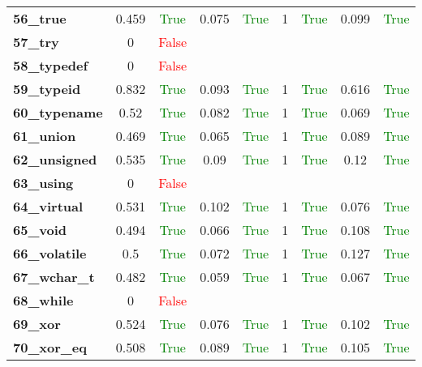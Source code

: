 \documentclass{article}
\begin{document}
\begin{xltabular}{\textwidth}{lcccccccc}
\textbf{56\_true}& 0.459&\textcolor{green}{True}& 0.075&\textcolor{green}{True}& 1&\textcolor{green}{True}& 0.099&\textcolor{green}{True} \\[0.5ex]
\textbf{57\_try}& 0&\textcolor{red}{False} \\[0.5ex]
\textbf{58\_typedef}& 0&\textcolor{red}{False} \\[0.5ex]
\textbf{59\_typeid}& 0.832&\textcolor{green}{True}& 0.093&\textcolor{green}{True}& 1&\textcolor{green}{True}& 0.616&\textcolor{green}{True} \\[0.5ex]
\textbf{60\_typename}& 0.52&\textcolor{green}{True}& 0.082&\textcolor{green}{True}& 1&\textcolor{green}{True}& 0.069&\textcolor{green}{True} \\[0.5ex]
\textbf{61\_union}& 0.469&\textcolor{green}{True}& 0.065&\textcolor{green}{True}& 1&\textcolor{green}{True}& 0.089&\textcolor{green}{True} \\[0.5ex]
\textbf{62\_unsigned}& 0.535&\textcolor{green}{True}& 0.09&\textcolor{green}{True}& 1&\textcolor{green}{True}& 0.12&\textcolor{green}{True} \\[0.5ex]
\textbf{63\_using}& 0&\textcolor{red}{False} \\[0.5ex]
\textbf{64\_virtual}& 0.531&\textcolor{green}{True}& 0.102&\textcolor{green}{True}& 1&\textcolor{green}{True}& 0.076&\textcolor{green}{True} \\[0.5ex]
\textbf{65\_void}& 0.494&\textcolor{green}{True}& 0.066&\textcolor{green}{True}& 1&\textcolor{green}{True}& 0.108&\textcolor{green}{True} \\[0.5ex]
\textbf{66\_volatile}& 0.5&\textcolor{green}{True}& 0.072&\textcolor{green}{True}& 1&\textcolor{green}{True}& 0.127&\textcolor{green}{True} \\[0.5ex]
\textbf{67\_wchar\_t}& 0.482&\textcolor{green}{True}& 0.059&\textcolor{green}{True}& 1&\textcolor{green}{True}& 0.067&\textcolor{green}{True} \\[0.5ex]
\textbf{68\_while}& 0&\textcolor{red}{False} \\[0.5ex]
\textbf{69\_xor}& 0.524&\textcolor{green}{True}& 0.076&\textcolor{green}{True}& 1&\textcolor{green}{True}& 0.102&\textcolor{green}{True} \\[0.5ex]
\textbf{70\_xor\_eq}& 0.508&\textcolor{green}{True}& 0.089&\textcolor{green}{True}& 1&\textcolor{green}{True}& 0.105&\textcolor{green}{True} \\[0.5ex]
\bottomrule
\end{xltabular}
\end{document}
